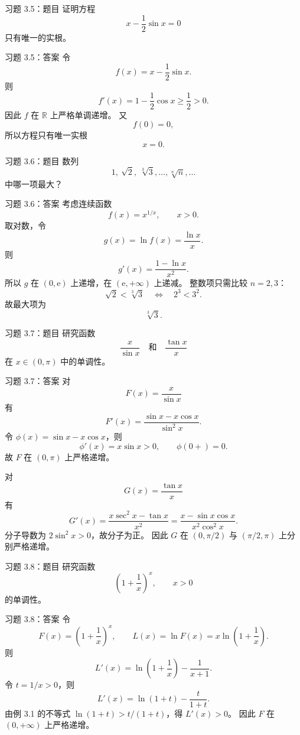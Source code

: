 \documentclass[aspectratio=169,10pt]{ctexbeamer}
\newcommand{\R}{\mathbb{R}}
\newcommand{\ee}{\mathrm{e}}
\begin{document}
\begin{frame}{习题 3.5：题目}
\small
证明方程
\[
  x-\frac12\sin x=0
\]
只有唯一的实根。
\end{frame}

\begin{frame}{习题 3.5：答案}
\small
令
\[
  f(x)=x-\frac12\sin x.
\]
则
\[
  f'(x)=1-\frac12\cos x\ge\frac12>0.
\]
因此 $f$ 在 $\R$ 上严格单调递增。
又
\[
  f(0)=0,
\]
所以方程只有唯一实根
\[
  x=0.
\]
\end{frame}

\begin{frame}{习题 3.6：题目}
\small
数列
\[
  1,\ \sqrt2,\ \sqrt[3]{3},\ldots,\sqrt[n]{n},\ldots
\]
中哪一项最大？
\end{frame}

\begin{frame}{习题 3.6：答案}
\small
考虑连续函数
\[
  f(x)=x^{1/x},\qquad x>0.
\]
取对数，令
\[
  g(x)=\ln f(x)=\frac{\ln x}{x}.
\]
则
\[
  g'(x)=\frac{1-\ln x}{x^2}.
\]
所以 $g$ 在 $(0,\ee)$ 上递增，在 $(\ee,+\infty)$ 上递减。
整数项只需比较 $n=2,3$：
\[
  \sqrt2<\sqrt[3]{3}
  \quad\Longleftrightarrow\quad 2^3<3^2.
\]
故最大项为
\[
  \sqrt[3]{3}.
\]
\end{frame}

\begin{frame}{习题 3.7：题目}
\small
研究函数
\[
  \frac{x}{\sin x}
  \quad\text{和}\quad
  \frac{\tan x}{x}
\]
在 $x\in(0,\pi)$ 中的单调性。
\end{frame}

\begin{frame}{习题 3.7：答案}
\footnotesize
对
\[
  F(x)=\frac{x}{\sin x}
\]
有
\[
  F'(x)=\frac{\sin x-x\cos x}{\sin^2x}.
\]
令 $\phi(x)=\sin x-x\cos x$，则
\[
  \phi'(x)=x\sin x>0,\qquad \phi(0+)=0.
\]
故 $F$ 在 $(0,\pi)$ 上严格递增。

对
\[
  G(x)=\frac{\tan x}{x}
\]
有
\[
  G'(x)=\frac{x\sec^2x-\tan x}{x^2}
       =\frac{x-\sin x\cos x}{x^2\cos^2x}.
\]
分子导数为 $2\sin^2x>0$，故分子为正。
因此 $G$ 在 $(0,\pi/2)$ 与 $(\pi/2,\pi)$ 上分别严格递增。
\end{frame}

\begin{frame}{习题 3.8：题目}
\small
研究函数
\[
  \left(1+\frac1x\right)^x,\qquad x>0
\]
的单调性。
\end{frame}

\begin{frame}{习题 3.8：答案}
\small
令
\[
  F(x)=\left(1+\frac1x\right)^x,\qquad
  L(x)=\ln F(x)=x\ln\left(1+\frac1x\right).
\]
则
\[
  L'(x)=\ln\left(1+\frac1x\right)-\frac1{x+1}.
\]
令 $t=1/x>0$，则
\[
  L'(x)=\ln(1+t)-\frac{t}{1+t}.
\]
由例 3.1 的不等式 $\ln(1+t)>t/(1+t)$，得 $L'(x)>0$。
因此 $F$ 在 $(0,+\infty)$ 上严格递增。
\end{frame}
\end{document}
